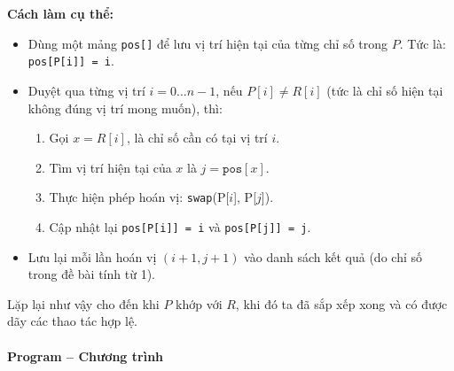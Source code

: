 \documentclass{article}
\begin{document}
\bigskip

\textbf{Cách làm cụ thể:}

\begin{itemize}
    \item Dùng một mảng \texttt{pos[]} để lưu vị trí hiện tại của từng chỉ số trong $P$. Tức là: \texttt{pos[P[i]] = i}.
    \item Duyệt qua từng vị trí $i = 0 \ldots n-1$, nếu $P[i] \ne R[i]$ (tức là chỉ số hiện tại không đúng vị trí mong muốn), thì:
    \begin{enumerate}
        \item Gọi $x = R[i]$, là chỉ số cần có tại vị trí $i$.
        \item Tìm vị trí hiện tại của $x$ là $j = \texttt{pos}[x]$.
        \item Thực hiện phép hoán vị: \texttt{swap}(P[$i$], P[$j$]).
        \item Cập nhật lại \texttt{pos[P[i]] = i} và \texttt{pos[P[j]] = j}.
    \end{enumerate}
    \item Lưu lại mỗi lần hoán vị $(i+1, j+1)$ vào danh sách kết quả (do chỉ số trong đề bài tính từ 1).
\end{itemize}

Lặp lại như vậy cho đến khi $P$ khớp với $R$, khi đó ta đã sắp xếp xong và có được dãy các thao tác hợp lệ.

\paragraph{Program -- Chương trình} \mbox{} \\
\end{document}
